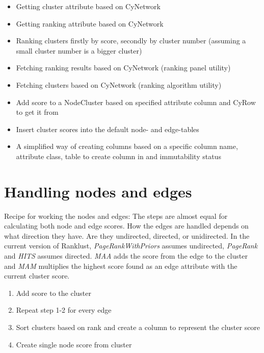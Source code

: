 \begin{itemize}
    \item Getting cluster attribute based on CyNetwork
    \item Getting ranking attribute based on CyNetwork
    \item Ranking clusters firstly by score, secondly by cluster number
        (assuming a small cluster number is a bigger cluster)
    \item Fetching ranking results based on CyNetwork (ranking panel utility)
    \item Fetching clusters based on CyNetwork (ranking algorithm utility)
    \item Add score to a NodeCluster based on specified attribute column and
        CyRow to get it from
    \item Insert cluster scores into the default node- and edge-tables
    \item A simplified way of creating columns based on a specific column name,
        attribute class, table to create column in and immutability status
\end{itemize}

\section{Handling nodes and edges}
Recipe for working the nodes and edges: The steps are almost equal for
calculating both node and edge scores. How the edges are handled depends on what
direction they have. Are they undirected, directed, or unidirected. In the
current version of Ranklust, \textit{PageRankWithPriors} assumes undirected,
\textit{PageRank} and \textit{HITS} assumes directed. \textit{MAA} adds the
score from the edge to the cluster and \textit{MAM} multiplies the highest score
found as an edge attribute with the current cluster score. 

\begin{enumerate}
    \item Add score to the cluster
    \item Repeat step 1-2 for every edge
    \item Sort clusters based on rank and create a column to represent the
        cluster score
    \item Create single node score from cluster
\end{enumerate}
